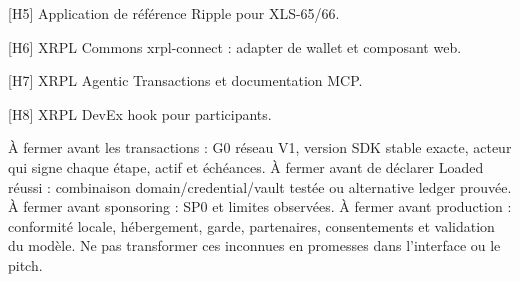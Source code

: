 \documentclass[10pt,a4paper]{article}
\begin{document}
[H5] Application de référence Ripple pour XLS-65/66. \par

[H6] XRPL Commons xrpl-connect : adapter de wallet et composant web. \par

[H7] XRPL Agentic Transactions et documentation MCP. \par

[H8] XRPL DevEx hook pour participants. \par

À fermer avant les transactions : G0 réseau V1, version SDK stable exacte, acteur qui signe chaque étape, actif et échéances. À fermer avant de déclarer Loaded réussi : combinaison domain/credential/vault testée ou alternative ledger prouvée. À fermer avant sponsoring : SP0 et limites observées. À fermer avant production : conformité locale, hébergement, garde, partenaires, consentements et validation du modèle. Ne pas transformer ces inconnues en promesses dans l'interface ou le pitch.\par
\end{document}
